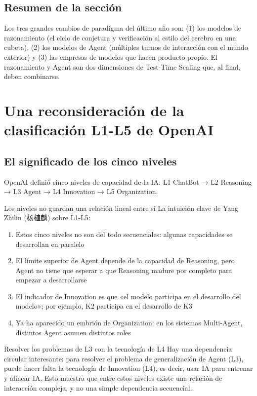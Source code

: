 \documentclass[a4paper]{article}
\begin{document}
\subsection{Resumen de la sección}

Los tres grandes cambios de paradigma del último año son: (1) los modelos de razonamiento (el ciclo de conjetura y verificación al estilo del cerebro en una cubeta), (2) los modelos de Agent (múltiples turnos de interacción con el mundo exterior) y (3) las empresas de modelos que hacen producto propio. El razonamiento y Agent son dos dimensiones de Test-Time Scaling que, al final, deben combinarse.

\section{Una reconsideración de la clasificación L1-L5 de OpenAI}

\subsection{El significado de los cinco niveles}

OpenAI definió cinco niveles de capacidad de la IA: L1 ChatBot → L2 Reasoning → L3 Agent → L4 Innovation → L5 Organization.

\begin{importantbox}{Los niveles no guardan una relación lineal entre sí}
La intuición clave de Yang Zhilin (杨植麟) sobre L1-L5:
\begin{enumerate}
    \item Estos cinco niveles no son del todo secuenciales: algunas capacidades se desarrollan en paralelo
    \item El límite superior de Agent depende de la capacidad de Reasoning, pero Agent no tiene que esperar a que Reasoning madure por completo para empezar a desarrollarse
    \item El indicador de Innovation es que «el modelo participa en el desarrollo del modelo»; por ejemplo, K2 participa en el desarrollo de K3
    \item Ya ha aparecido un embrión de Organization: en los sistemas Multi-Agent, distintos Agent asumen distintos roles
\end{enumerate}
\end{importantbox}

\begin{knowledgebox}{Resolver los problemas de L3 con la tecnología de L4}
Hay una dependencia circular interesante: para resolver el problema de generalización de Agent (L3), puede hacer falta la tecnología de Innovation (L4), es decir, usar IA para entrenar y alinear IA. Esto muestra que entre estos niveles existe una relación de interacción compleja, y no una simple dependencia secuencial.
\end{knowledgebox}
\end{document}
